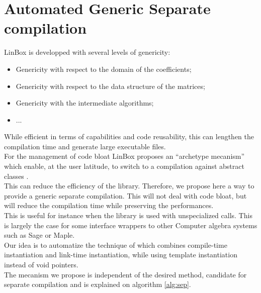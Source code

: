 \documentclass[runningheads,a4paper]{llncs}
\newcommand{\linboxsp}{{\sc LinBox}\xspace}
\begin{document}
\section{Automated Generic Separate compilation}
\linboxsp is developped with several levels of genericity:
\begin{itemize}
\item Genericity with respect to the domain of the coefficients;
\item Genericity with respect to the data structure of the matrices;
\item Genericity with the intermediate algorithms;
\item ...
\end{itemize}
While efficient in terms of capabilities and code reusability, this
can lengthen the compilation time and generate large executable files.\\
For the management of code bloat \linboxsp proposes an ``archetype
mecanism'' which enable, at the user latitude, to switch to a
compilation against abstract classes \cite[\S 2.1]{jgd:2002:icms}.\\
This can reduce the efficiency of the library. Therefore, we propose
here a way to provide a generic separate compilation. This will not
deal with code bloat, but will reduce the compilation time while
preserving the performances.\\
This is useful for instance when the library is used with
unspecialized calls. This is largely the case for some interface
wrappers to other Computer algebra systems such as {\sc Sage} or {\sc Maple}.\\
Our idea is to automatize the technique of
\cite{Erlingsson:1996:issac} which combines compile-time instantiation
and link-time instantiation, while using template instantiation
instead of void pointers.\\
The mecanism we propose is independent of the desired method, candidate
for separate compilation and is explained on algorithm \ref{alg:sep}.\\
\end{document}
